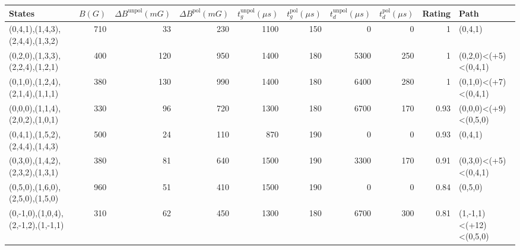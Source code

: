 \begin{tabular}{lrrrrrrrrl}
\hline
 {States}                           &   {$B(G)$} &   {$\Delta B^{\text{unpol}}(mG)$} &   {$\Delta B^{\text{pol}}(mG)$} &   {$t^{\text{unpol}}_{g}(\mu s)$} &   {$t^{\text{pol}}_{g}(\mu s)$} &   {$t^{\text{unpol}}_{d}(\mu s)$} &   {$t^{\text{pol}}_{d}(\mu s)$} &   {Rating} & {Path}                 \\
\hline
 (0,4,1),(1,4,3),(2,4,4),(1,3,2)    &        710 &                                33 &                             230 &                              1100 &                             150 &                                 0 &                               0 &       1    & (0,4,1)                \\
 (0,2,0),(1,3,3),(2,2,4),(1,2,1)    &        400 &                               120 &                             950 &                              1400 &                             180 &                              5300 &                             250 &       1    & (0,2,0)<(+5)<(0,4,1)   \\
 (0,1,0),(1,2,4),(2,1,4),(1,1,1)    &        380 &                               130 &                             990 &                              1400 &                             180 &                              6400 &                             280 &       1    & (0,1,0)<(+7)<(0,4,1)   \\
 (0,0,0),(1,1,4),(2,0,2),(1,0,1)    &        330 &                                96 &                             720 &                              1300 &                             180 &                              6700 &                             170 &       0.93 & (0,0,0)<(+9)<(0,5,0)   \\
 (0,4,1),(1,5,2),(2,4,4),(1,4,3)    &        500 &                                24 &                             110 &                               870 &                             190 &                                 0 &                               0 &       0.93 & (0,4,1)                \\
 (0,3,0),(1,4,2),(2,3,2),(1,3,1)    &        380 &                                81 &                             640 &                              1500 &                             190 &                              3300 &                             170 &       0.91 & (0,3,0)<(+5)<(0,4,1)   \\
 (0,5,0),(1,6,0),(2,5,0),(1,5,0)    &        960 &                                51 &                             410 &                              1500 &                             190 &                                 0 &                               0 &       0.84 & (0,5,0)                \\
 (0,-1,0),(1,0,4),(2,-1,2),(1,-1,1) &        310 &                                62 &                             450 &                              1300 &                             180 &                              6700 &                             300 &       0.81 & (1,-1,1)<(+12)<(0,5,0) \\
\hline
\end{tabular}